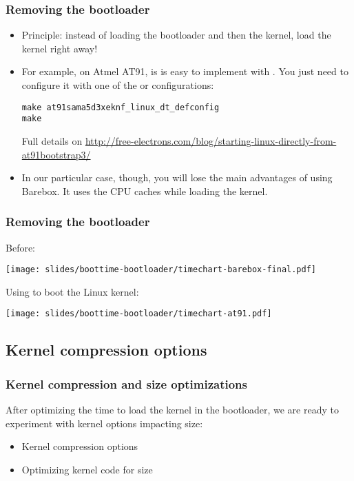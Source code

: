 \begin{frame}[fragile]
\frametitle{Removing the bootloader}
\begin{itemize}
\item Principle: instead of loading the bootloader and then the kernel,
      load the kernel right away!
\item For example, on Atmel AT91, is is easy to implement with
      . You just need to configure it
      with one of the  or  configurations:
\begin{block}{}
\begin{verbatim}
make at91sama5d3xeknf_linux_dt_defconfig
make
\end{verbatim}
\end{block}
      Full details on
      \url{http://free-electrons.com/blog/starting-linux-directly-from-at91bootstrap3/}

\item In our particular case, though, you will lose the
      main advantages of using Barebox.  It uses the CPU caches
      while loading the kernel.
\end{itemize}
\end{frame}

\begin{frame}
\frametitle{Removing the bootloader}
Before:
\begin{center}
    \texttt{[image: slides/boottime-bootloader/timechart-barebox-final.pdf]}
\end{center}
Using  to boot the Linux kernel:
\begin{center}
    \texttt{[image: slides/boottime-bootloader/timechart-at91.pdf]}
\end{center}
\end{frame}


\subsection{Kernel compression options}

\begin{frame}
\frametitle{Kernel compression and size optimizations}
After optimizing the time to load the kernel in the
bootloader, we are ready to experiment with kernel 
options impacting size:
\begin{itemize}
\item Kernel compression options
\item Optimizing kernel code for size 
\end{itemize}
\end{frame}


